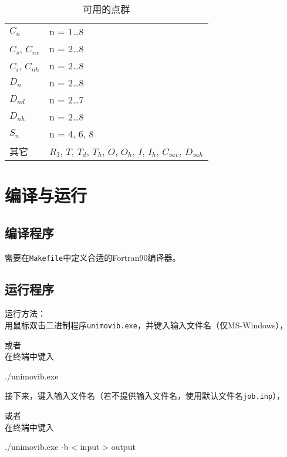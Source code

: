 \documentclass[12pt,a4paper,openany,twoside,cap,UTF8]{ctexbook}
\begin{document}
\begin{table}[!htbp]
\caption{可用的点群}\label{tab:symm}
\small\centering
\begin{tabular}{ll}
\hline\hline
$C_{n}$           & n = 1\ldots 8 \\
$C_s$, $C_{nv}$   & n = 2\ldots 8 \\
$C_i$, $C_{nh}$   & n = 2\ldots 8 \\
$D_{n}$           & n = 2\ldots 8 \\
$D_{nd}$          & n = 2\ldots 7 \\
$D_{nh}$          & n = 2\ldots 8 \\
$S_{n}$           & n = 4, 6, 8 \\
其它            & $R_3$, $T$, $T_d$, $T_h$, $O$, $O_h$, $I$, $I_h$, $C_{\infty v}$, $D_{\infty h}$ \\
\hline\hline
\end{tabular}
\end{table}


\chapter{编译与运行} \label{part:setting}

\section{编译程序} \label{sec:install}

需要在\verb|Makefile|中定义合适的Fortran90编译器。


\section{运行程序} \label{sec:run}

运行方法：\\
用鼠标双击二进制程序\verb|unimovib.exe|，并键入输入文件名（仅MS-Windows），

或者 \\
在终端中键入
\begin{commandshell}
./unimovib.exe
\end{commandshell}
\noindent 接下来，键入输入文件名（若不提供输入文件名，使用默认文件名\verb|job.inp|），

或者 \\
在终端中键入
\begin{commandshell}
./unimovib.exe -b < input > output
\end{commandshell}
\end{document}

